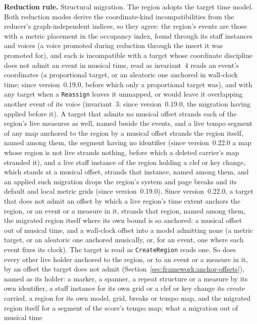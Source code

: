 \documentclass[11pt,letterpaper]{report}
\begin{document}
\textbf{Reduction rule.} Structural migration. The region adopts the target time
model. Both reduction modes derive the coordinate-kind incompatibilities from
the reducer's graph-independent indices, so they agree: the region's events are
those with a metric placement in the occupancy index, found through its staff
instances and voices (a voice promoted during reduction through the insert it
was promoted for), and each is incompatible with a target whose coordinate
discipline does not admit an event in musical time, read as invariant~4 reads
an event's coordinates (a proportional target, or an aleatoric one anchored in
wall-clock time; since version~0.19.0, before which only a proportional target
was), and with any target when a \texttt{Reassign} leaves it unmapped, or would leave it
overlapping another event of its voice (invariant~3; since version~0.19.0, the
migration having applied before it). A target that admits no musical offset
strands each of the region's live measures as well, named beside the events,
and a live tempo segment of any map anchored to the region by a musical offset
strands the region itself, named among them, the segment having no identifier
(since version~0.22.0 a map whose region is not live strands nothing, before
which a deleted carrier's map stranded it),
and a live staff instance of the region holding a clef or key change, which
stands at a musical offset, strands that instance, named among them,
and an applied such migration drops the region's system and page breaks and
its default and local metric grids (since version~0.19.0). Since
version~0.22.0, a target that does not admit an offset by which a live
region's time extent anchors the region, or an event or a measure in it,
strands that region, named among them, the migrated region itself where its
own bound is so anchored: a musical offset out of musical time, and a
wall-clock offset into a model admitting none (a metric target, or an
aleatoric one anchored musically, or, for an event, one where each event
fixes its clock). The target is read as \texttt{CreateRegion} reads one. So
does every other live holder anchored to the region, or to an event or a
measure in it, by an offset the target does not admit
(Section~\ref{sec:framework:anchor-offsets}), named as its holder: a marker, a
spanner, a repeat structure or a measure by its own identifier, a staff
instance for its own grid or a clef or key change its create carried, a region
for its own model, grid, breaks or tempo map, and the migrated region itself
for a segment of the score's tempo map; what a migration out of musical time
\end{document}
